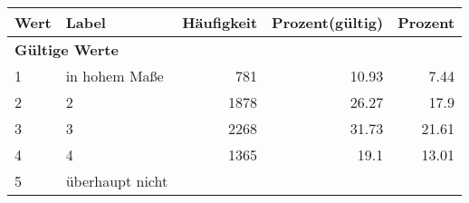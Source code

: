      \begin{longtable}{lXrrr}
     \toprule
     \textbf{Wert} & \textbf{Label} & \textbf{Häufigkeit} & \textbf{Prozent(gültig)} & \textbf{Prozent} \\
     \endhead
     \midrule
     \multicolumn{5}{l}{\textbf{Gültige Werte}}\\

     1 &
     \multicolumn{1}{X}{ in hohem Maße   } &


       \num{781} &
       \num[round-mode=places,round-precision=2]{10.93} &
         \num[round-mode=places,round-precision=2]{7.44} \\

     2 &
     \multicolumn{1}{X}{ 2   } &


       \num{1878} &
       \num[round-mode=places,round-precision=2]{26.27} &
         \num[round-mode=places,round-precision=2]{17.9} \\

     3 &
     \multicolumn{1}{X}{ 3   } &


       \num{2268} &
       \num[round-mode=places,round-precision=2]{31.73} &
         \num[round-mode=places,round-precision=2]{21.61} \\

     4 &
     \multicolumn{1}{X}{ 4   } &


       \num{1365} &
       \num[round-mode=places,round-precision=2]{19.1} &
         \num[round-mode=places,round-precision=2]{13.01} \\

     5 &
     \multicolumn{1}{X}{ überhaupt nicht   } &



\end{longtable}
